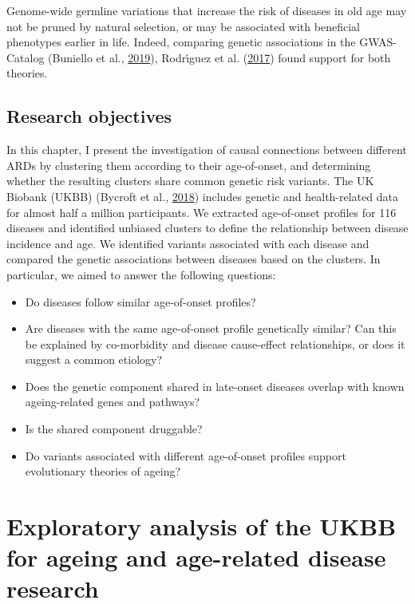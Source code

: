 \documentclass[12pt,twoside]{unicam}
\providecommand{\tightlist}{%
  \setlength{\itemsep}{0pt}\setlength{\parskip}{0pt}}
\begin{document}
Genome-wide germline variations that increase the risk of diseases in old age may not be pruned by natural selection, or may be associated with beneficial phenotypes earlier in life. Indeed, comparing genetic associations in the GWAS-Catalog (Buniello et al., \protect\hyperlink{ref-Buniello2019}{2019}), Rodrı́guez et al. (\protect\hyperlink{ref-Rodriguez2017}{2017}) found support for both theories.

\hypertarget{research-objectives-1}{%
\subsection{Research objectives}\label{research-objectives-1}}

In this chapter, I present the investigation of causal connections between different ARDs by clustering them according to their age-of-onset, and determining whether the resulting clusters share common genetic risk variants. The UK Biobank (UKBB) (Bycroft et al., \protect\hyperlink{ref-Bycroft2018}{2018}) includes genetic and health-related data for almost half a million participants. We extracted age-of-onset profiles for 116 diseases and identified unbiased clusters to define the relationship between disease incidence and age. We identified variants associated with each disease and compared the genetic associations between diseases based on the clusters. In particular, we aimed to answer the following questions:

\begin{itemize}
\tightlist
\item
  Do diseases follow similar age-of-onset profiles?
\item
  Are diseases with the same age-of-onset profile genetically similar? Can this be explained by co-morbidity and disease cause-effect relationships, or does it suggest a common etiology?
\item
  Does the genetic component shared in late-onset diseases overlap with known ageing-related genes and pathways?
\item
  Is the shared component druggable?
\item
  Do variants associated with different age-of-onset profiles support evolutionary theories of ageing?
\end{itemize}

\hypertarget{exploratory-analysis-of-the-ukbb-for-ageing-and-age-related-disease-research}{%
\section{Exploratory analysis of the UKBB for ageing and age-related disease research}\label{exploratory-analysis-of-the-ukbb-for-ageing-and-age-related-disease-research}}
\end{document}
